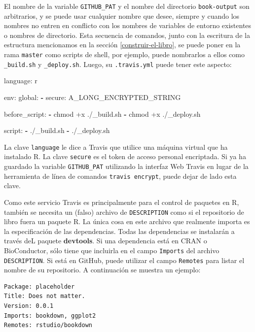 \documentclass[12pt,]{krantz}
\makeatletter
\newenvironment{Shaded}{\begin{snugshade}}{\end{snugshade}}
\newcommand{\KeywordTok}[1]{\textcolor[rgb]{0.13,0.29,0.53}{\textbf{{#1}}}}
\newcommand{\FunctionTok}[1]{\textcolor[rgb]{0.00,0.00,0.00}{{#1}}}
\newcommand{\NormalTok}[1]{{#1}}
\newenvironment{kframe}{%
\medskip{}
\setlength{\fboxsep}{.8em}
 \def\at@end@of@kframe{}%
 \ifinner\ifhmode%
  \def\at@end@of@kframe{\end{minipage}}%
  \begin{minipage}{\columnwidth}%
 \fi\fi%
 \def\FrameCommand##1{\hskip\@totalleftmargin \hskip-\fboxsep
 \colorbox{shadecolor}{##1}\hskip-\fboxsep
     \hskip-\linewidth \hskip-\@totalleftmargin \hskip\columnwidth}%
 \MakeFramed {\advance\hsize-\width
   \@totalleftmargin\z@ \linewidth\hsize
   \@setminipage}}%
 {\par\unskip\endMakeFramed%
 \at@end@of@kframe}
\renewenvironment{Shaded}{\begin{kframe}}{\end{kframe}}
\theoremstyle{definition}
\theoremstyle{definition}
\theoremstyle{remark}
\makeatother
\begin{document}
El nombre de la variable \texttt{GITHUB\_PAT} y el nombre del directorio
\texttt{book-output} son arbitrarios, y se puede usar cualquier nombre
que desee, siempre y cuando los nombres no entren en conflicto con los
nombres de variables de entorno existentes o nombres de directorio. Esta
secuencia de comandos, junto con la escritura de la estructura
mencionamos en la sección \ref{construir-el-libro}, se puede poner en la
rama \texttt{master} como scripts de shell, por ejemplo, puede
nombrarlos a ellos como \texttt{\_build.sh} y \texttt{\_deploy.sh}.
Luego, su \texttt{.travis.yml} puede tener este aspecto:

\begin{Shaded}
\begin{Highlighting}[]
\FunctionTok{language:} \NormalTok{r}

\FunctionTok{env:}
  \FunctionTok{global:}
    \KeywordTok{-} \FunctionTok{secure:} \NormalTok{A_LONG_ENCRYPTED_STRING}

\FunctionTok{before_script:}
  \KeywordTok{-} \NormalTok{chmod +x ./_build.sh}
  \KeywordTok{-} \NormalTok{chmod +x ./_deploy.sh}

\FunctionTok{script:}
  \KeywordTok{-} \NormalTok{./_build.sh}
  \KeywordTok{-} \NormalTok{./_deploy.sh}
\end{Highlighting}
\end{Shaded}

La clave \texttt{language} le dice a Travis que utilice una máquina
virtual que ha instalado R. La clave \texttt{secure} es el token de
acceso personal encriptada. Si ya ha guardado la variable
\texttt{GITHUB\_PAT} utilizando la interfaz Web Travis en lugar de la
herramienta de línea de comandos \texttt{travis\ encrypt}, puede dejar
de lado esta clave.

Como este servicio Travis es principalmente para el control de paquetes
en R, también se necesita un (falso) archivo de \texttt{DESCRIPTION}
como si el repositorio de libro fuera un paquete R. La única cosa en
este archivo que realmente importa es la especificación de las
dependencias. Todas las dependencias se instalarán a través deL paquete
\textbf{devtools}. Si una dependencia está en CRAN o BioConductor, sólo
tiene que incluirla en el campo \texttt{Imports} del archivo
\texttt{DESCRIPTION}. Si está en GitHub, puede utilizar el campo
\texttt{Remotes} para listar el nombre de su repositorio. A continuación
se muestra un ejemplo:

\begin{verbatim}
Package: placeholder
Title: Does not matter.
Version: 0.0.1
Imports: bookdown, ggplot2
Remotes: rstudio/bookdown
\end{verbatim}
\end{document}
